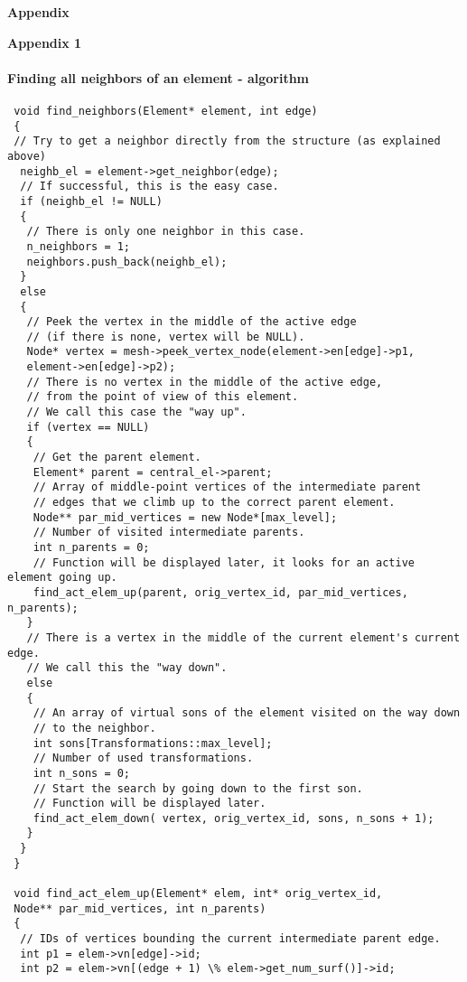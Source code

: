 \begin{flushleft}
{\LARGE{\textbf{{Appendix}}}}
\end{flushleft}

\begin{flushleft}
{\Large{\textbf{{Appendix 1}}}}
\end{flushleft}

\paragraph{Finding all neighbors of an element - algorithm}
\begin{lstlisting}
 void find_neighbors(Element* element, int edge)
 {
 // Try to get a neighbor directly from the structure (as explained above)
  neighb_el = element->get_neighbor(edge);
  // If successful, this is the easy case.
  if (neighb_el != NULL)
  {
   // There is only one neighbor in this case.
   n_neighbors = 1;
   neighbors.push_back(neighb_el);
  }
  else
  {
   // Peek the vertex in the middle of the active edge
   // (if there is none, vertex will be NULL).
   Node* vertex = mesh->peek_vertex_node(element->en[edge]->p1,
   element->en[edge]->p2);
   // There is no vertex in the middle of the active edge,
   // from the point of view of this element.
   // We call this case the "way up".
   if (vertex == NULL)
   {
    // Get the parent element.
    Element* parent = central_el->parent;
    // Array of middle-point vertices of the intermediate parent
    // edges that we climb up to the correct parent element.
    Node** par_mid_vertices = new Node*[max_level];
    // Number of visited intermediate parents.
    int n_parents = 0;
    // Function will be displayed later, it looks for an active element going up.
    find_act_elem_up(parent, orig_vertex_id, par_mid_vertices, n_parents);
   }
   // There is a vertex in the middle of the current element's current edge.
   // We call this the "way down".
   else
   {
    // An array of virtual sons of the element visited on the way down
    // to the neighbor.
    int sons[Transformations::max_level]; 
    // Number of used transformations.
    int n_sons = 0;
    // Start the search by going down to the first son.
    // Function will be displayed later.
    find_act_elem_down( vertex, orig_vertex_id, sons, n_sons + 1);
   }
  }
 }

 void find_act_elem_up(Element* elem, int* orig_vertex_id,
 Node** par_mid_vertices, int n_parents)
 {
  // IDs of vertices bounding the current intermediate parent edge.
  int p1 = elem->vn[edge]->id;
  int p2 = elem->vn[(edge + 1) \% elem->get_num_surf()]->id;


\end{lstlisting}
